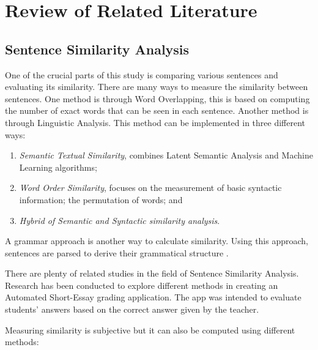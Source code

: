 \documentclass[journal]{./IEEEtran}
\begin{document}
	\section{Review of Related Literature}

	\subsection{Sentence Similarity Analysis}
	\pubidadjcol
	One of the crucial parts of this study is comparing various sentences and evaluating its similarity. There are many ways to measure the similarity between sentences. One method is through Word Overlapping, this is based on computing the number of exact words that can be seen in each sentence. Another method is through Linguistic Analysis. This method can be implemented in three different ways\cite{achananuparp}:
	
	\begin{enumerate}
		\item \emph{Semantic Textual Similarity}, combines Latent Semantic Analysis and Machine Learning algorithms;
		\item \emph{Word Order Similarity}, focuses on the measurement of basic syntactic information; the permutation of words; and
		\item \emph{Hybrid of Semantic and Syntactic similarity analysis}.
	\end{enumerate}
	
	A grammar approach is another way to calculate similarity. Using this approach, sentences are parsed to derive their grammatical structure \cite{lee14}.
	
	There are plenty of related studies in the field of Sentence Similarity Analysis. Research has been conducted to explore different methods in creating an Automated Short-Essay grading application. The app was intended to evaluate students' answers based on the correct answer given by the teacher.
	
	Measuring similarity is subjective but it can also be computed using different methods:
	
\end{document}
